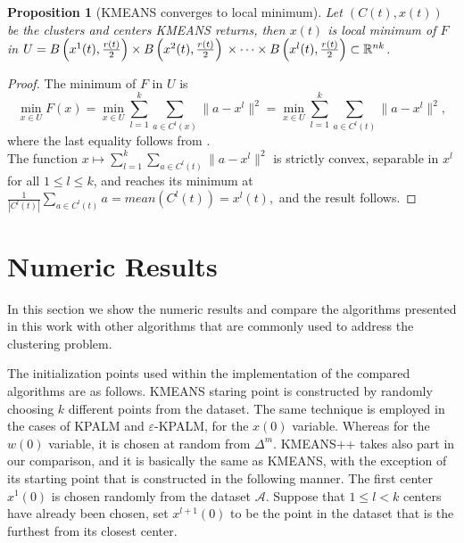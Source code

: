 \documentclass[12pt]{article}
\numberwithin{equation}{section}
\newtheorem{proposition}{Proposition}[section]
\begin{document}
\begin{proposition}[KMEANS converges to local minimum]
Let $(C(t), x(t))$ be the clusters and centers KMEANS returns, then $x(t)$ is local minimum of $F$ in $U = B\left( x^1(t),\frac{r(t)}{2}\right) \times  B\left( x^2(t),\frac{r(t)}{2}\right) \\ \times \cdots \times B\left( x^l(t),\frac{r(t)}{2} \right) \subset \mathbb{R}^{nk}$.
\end{proposition}

\begin{proof}
The minimum of $F$ in $U$ is
\begin{equation*}
\min\limits_{x \in U} F(x) = \min\limits_{x \in U} \sum\limits_{l=1}^{k} \sum\limits_{a \in C^l(x)} \|a - x^l \|^2 = \min\limits_{x \in U} \sum\limits_{l=1}^{k} \sum\limits_{a \in C^l(t)} \|a - x^l \|^2 ,
\end{equation*}
where the last equality follows from . \\
The function $x \mapsto \sum\limits_{l=1}^{k} \sum\limits_{a \in C^l(t)} \|a - x^l \|^2$ is strictly convex, separable in $x^l$ for all $1 \leq l \leq k$, and reaches its minimum at $\frac{1}{\left| C^l(t) \right|} \sum\limits_{a \in C^l(t)} a = mean(C^l(t)) = x^l(t),$ and the result follows.
\end{proof}

\section{Numeric Results}
In this section we show the numeric results and compare the algorithms presented in this work with other algorithms that are commonly used to address the clustering problem.

The initialization points used within the implementation of the compared algorithms are as follows. KMEANS staring point is constructed by randomly choosing $k$ different points from the dataset. The same technique is employed in the cases of KPALM and $\varepsilon$-KPALM, for the $x(0)$ variable. Whereas for the $w(0)$ variable, it is chosen at random from $\Delta^m$. KMEANS++ takes also part in our comparison, and it is basically the same as KMEANS, with the exception of its starting point that is constructed in the following manner. The first center $x^1(0)$ is chosen randomly from the dataset $\mathcal{A}$. Suppose that $1 \leq l < k$ centers have already been chosen, set $x^{l+1}(0)$ to be the point in the dataset that is the furthest from its closest center.
\end{document}

